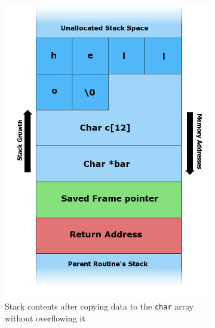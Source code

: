 \begin{figure}[htb]
\begin{subfigure}[t]{0.3\textwidth}
		\includegraphics[height=0.25\textheight]{figures/Stack_Overflow_3}
		\caption{Stack contents after copying data to the \texttt{char} array without overflowing it \cite{Lynn2007a}}
		\label{fig:stack-layout-no-overflow}
	\end{subfigure}
	\hfill
	\begin{subfigure}[t]{0.3\textwidth}
		\centering

\end{subfigure}
\end{figure}
